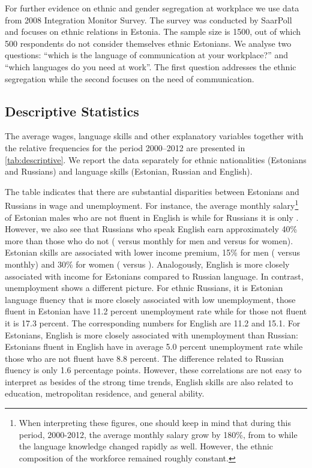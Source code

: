 \documentclass[12pt, a4paper]{article}
\begin{document}
For further evidence on ethnic and gender segregation at workplace we use data
from 2008 Integration Monitor Survey.  The survey was conducted by
SaarPoll and focuses on
ethnic relations in Estonia.  The sample size is 1500, out of which 
500 respondents do not consider themselves ethnic Estonians.  We analyse
two questions: ``which is the language of communication at your
workplace?'' and ``which languages do you need at work''.  The first
question addresses the ethnic segregation while the second focuses on
the need of communication.


\subsection{Descriptive Statistics}
\label{sec:descriptive}

The average wages, language skills and other explanatory variables together with the relative frequencies for the period 2000--2012 are presented in \cref{tab:descriptive}. We report the data separately for ethnic nationalities (Estonians and Russians) and language
skills (Estonian, Russian and English).

The table indicates that there are substantial disparities between
Estonians and Russians in wage and unemployment. For instance, the
average monthly salary\footnote{When interpreting these figures,
  one should keep in mind that during this period, 2000-2012, the average monthly salary grow by 180\%,
  from  to  while the language knowledge changed rapidly as
  well.  However, the ethnic composition of the workforce remained
  roughly constant.} of Estonian
males who are not fluent in English is  while for Russians it
is only . However, we also see that Russians who speak
English earn approximately 40\% more than those who do not (
versus  monthly for men and  versus  for
women). Estonian skills are associated with lower income premium, 15\%
for men ( versus  monthly) and 30\% for women
( versus ).  Analogously, English is more closely
associated with income for Estonians compared to Russian language. In
contrast, unemployment shows a different picture. For ethnic Russians,
it is Estonian language fluency that is more closely associated with
low unemployment, those fluent in Estonian have 11.2 percent
unemployment rate while for those not fluent it is 17.3 percent.  The
corresponding numbers for English are 11.2 and 15.1.  For Estonians,
English is more closely associated with unemployment than Russian:
Estonians fluent in English have in average 5.0 percent unemployment rate
while those who are not fluent have 8.8 percent.  The difference
related to Russian fluency is only 1.6 percentage points.  However,
these correlations are not easy to interpret as besides of the strong
time trends, English skills are
also related to education, metropolitan residence, and general
ability.
\end{document}

